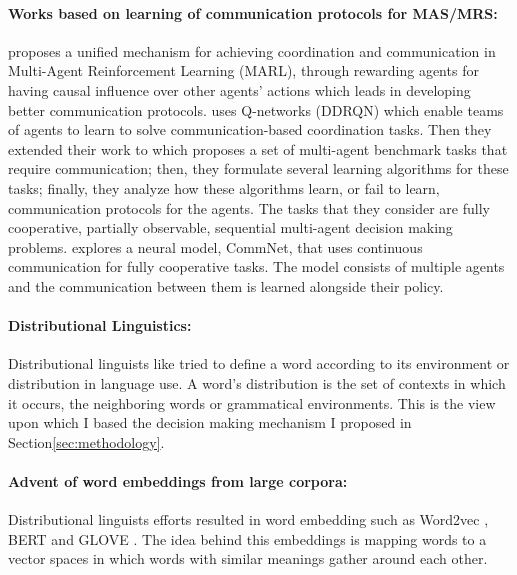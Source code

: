 \documentclass{article}
\begin{document}
\begin{multicols}{2}
		\paragraph{Works based on learning of communication protocols for MAS/MRS:}
		\cite{jaques-2019-social-influence-as-intrinsic-motivation-for-multi-agent-deep-reinforcement-learning} proposes a unified mechanism for achieving coordination and communication in Multi-Agent Reinforcement Learning (MARL), through rewarding agents for having causal influence over other agents’ actions which leads in developing better communication protocols. 
		\cite{foerster-2016-learning-to-communicate-to-solve-riddles-with-deep-distributed-recurrent-q-networks} uses  Q-networks (DDRQN) which enable teams of agents to learn to solve communication-based coordination tasks. Then they extended their work to
		\cite{foerster-2016-learning-to-communicate-with-deep-multi-agent-reinforcement-learning} which proposes a set of multi-agent benchmark tasks that require communication; then, they formulate several learning algorithms for these tasks; finally, they analyze how these algorithms learn, or fail to learn, communication protocols for the agents. The tasks that they consider are fully cooperative, partially observable, sequential multi-agent decision making problems. \cite{sukhbaatar-2016-learning-multiagent-communication-with-backpropagation}  explores a neural model, CommNet, that uses continuous communication for fully cooperative tasks. The model consists of multiple agents and the communication between them is learned alongside their policy.
		
		\paragraph{Distributional Linguistics:} Distributional linguists like \citep{firth-1957-studies-in-linguistic-analysis} tried to define a word according to its environment or distribution in language use. A word’s distribution is the set of contexts in which it occurs, the neighboring words or grammatical environments. This is the view upon which I based the decision making mechanism I proposed in Section\ref{sec:methodology}.
		
		\paragraph{Advent of word embeddings from large corpora:} Distributional linguists efforts resulted in word embedding such as Word2vec \citep{mikolov-2013-distributed-representations-of-words-and-phrases-and-their-compositionality}, BERT \citep{devlin-2019-bert-pre-training-of-deep-bidirectional-transformers-for-language-understanding} and GLOVE \cite{pennington-2014-glove-global-vectors-for-word-representation}. The idea behind this embeddings is mapping words to a vector spaces in which words with similar meanings gather around each other.
		

\end{multicols}
\end{document}
